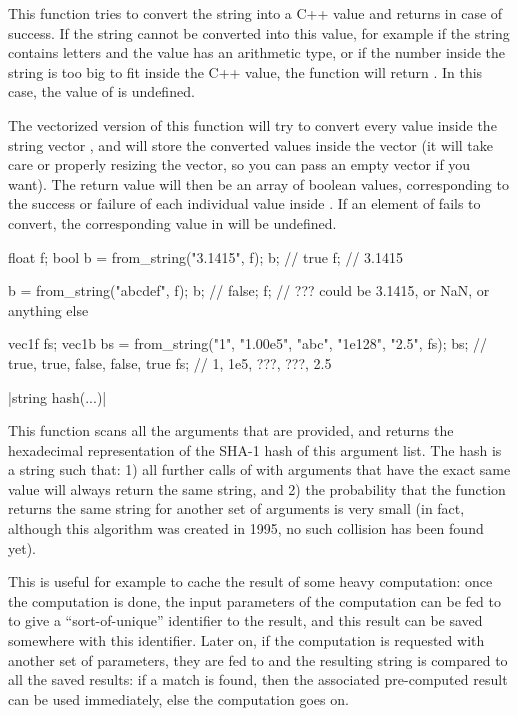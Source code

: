 This function tries to convert the string  into a C++ value  and returns \cpptrue in case of success. If the string cannot be converted into this value, for example if the string contains letters and the value has an arithmetic type, or if the number inside the string is too big to fit inside the C++ value, the function will return \cppfalse. In this case, the value of  is undefined.

The vectorized version of this function will try to convert every value inside the string vector , and will store the converted values inside the vector  (it will take care or properly resizing the vector, so you can pass an empty vector if you want). The return value will then be an array of boolean values, corresponding to the success or failure of each individual value inside . If an element of  fails to convert, the corresponding value in  will be undefined.

\begin{example}
\begin{cppcode}
float f;
bool b = from_string("3.1415", f);
b; // true
f; // 3.1415

b = from_string("abcdef", f);
b; // false;
f; // ??? could be 3.1415, or NaN, or anything else

vec1f fs;
vec1b bs = from_string({"1", "1.00e5", "abc", "1e128", "2.5"}, fs);
bs; // {true, true, false, false, true}
fs; // {1,    1e5,  ???,   ???,   2.5}
\end{cppcode}
\end{example}

\funcitem \cppinline|string hash(...)| 

This function scans all the arguments that are provided, and returns the hexadecimal representation of the SHA-1 hash of this argument list. The hash is a string such that: 1) all further calls of  with arguments that have the exact same value will always return the same string, and 2) the probability that the function returns the same string for another set of arguments is very small (in fact, although this algorithm was created in 1995, no such collision has been found yet).

This is useful for example to cache the result of some heavy computation: once the computation is done, the input parameters of the computation can be fed to  to give a ``sort-of-unique'' identifier to the result, and this result can be saved somewhere with this identifier. Later on, if the computation is requested with another set of parameters, they are fed to  and the resulting string is compared to all the saved results: if a match is found, then the associated pre-computed result can be used immediately, else the computation goes on.

